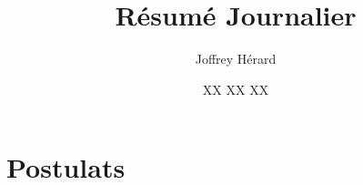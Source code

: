 \documentclass[a4paper]{article}
\begin{document}
\title{Résumé Journalier}
\author{Joffrey Hérard}
\date{XX XX XX } 

\maketitle

\section{Postulats}

\newpage
%
\end{document}
